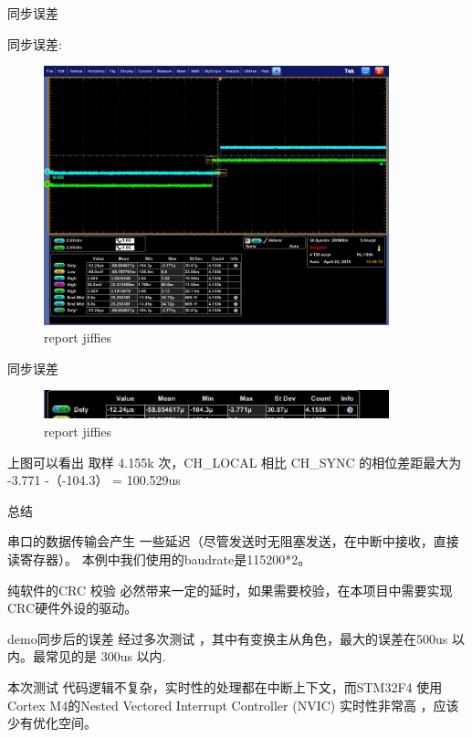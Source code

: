 \begin{frame}[fragile]{同步误差}

同步误差:

  \begin{figure}[htbp]
  \begin{center}
  \includegraphics[width=10cm]{img/mis3}
  \caption{report jiffies}
  \label{report}
  \end{center}
  \vspace{-0.5em}
  \end{figure}

\end{frame}


\begin{frame}[fragile]{同步误差}

  \begin{figure}[htbp]
  \begin{center}
  \includegraphics[width=10cm]{img/delay}
  \caption{report jiffies}
  \label{report}
  \end{center}
  \vspace{-0.5em}
  \end{figure}

上图可以看出 取样 4.155k 次，CH\_LOCAL 相比 CH\_SYNC 的相位差距最大为
-3.771 -（-104.3） = 100.529us

\end{frame}


\begin{frame}[fragile]{总结}

串口的数据传输会产生 一些延迟（尽管发送时无阻塞发送，在中断中接收，直接读寄存器）。 本例中我们使用的baudrate是115200*2。

纯软件的CRC 校验 必然带来一定的延时，如果需要校验，在本项目中需要实现CRC硬件外设的驱动。

demo同步后的误差 经过多次测试 ，其中有变换主从角色，最大的误差在500us 以内。最常见的是
300us 以内.

本次测试 代码逻辑不复杂，实时性的处理都在中断上下文，而STM32F4 使用Cortex M4的Nested Vectored Interrupt Controller (NVIC) 实时性非常高 ，应该少有优化空间。

\end{frame}
